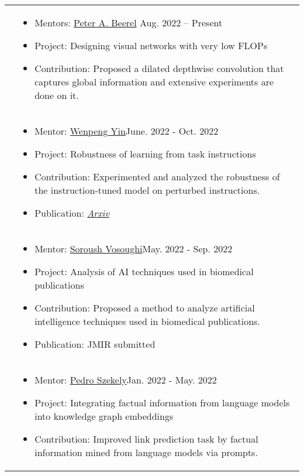 \documentclass[letterpaper, 10pt]{article}
\begin{document}
\begin{longtable}{p{1.3in}p{4.8in}}
&  \begin{itemize}[leftmargin=10pt, itemsep=-5pt, topsep=0pt,before=\textbf{University of Southern California}]
    \item Mentors: \href{https://sites.usc.edu/eessc/people/}{Peter A. Beerel} \hfill Aug. 2022 -- Present 
    \item Project: Designing visual networks with very low FLOPs
    \item Contribution: Proposed a dilated depthwise convolution that captures global information and extensive experiments are done on it.
  \end{itemize}\\ 
  

&  \begin{itemize}[leftmargin=10pt, itemsep=-5pt, topsep=0pt,before=\textbf{Pennsylvania State University}]
    \item Mentor: \href{https://www.wenpengyin.org/}{Wenpeng Yin}\hfill June. 2022 - Oct. 2022
    \item Project: Robustness of learning from task instructions\hfill
    \item Contribution: Experimented and analyzed the robustness of the instruction-tuned model on perturbed instructions.
    \item Publication: \href{https://arxiv.org/abs/2212.03813}{\textit{Arxiv}}
  \end{itemize}\\ 

&  \begin{itemize}[leftmargin=10pt, itemsep=-5pt, topsep=0pt,before=\textbf{Dartmouth College}]
    \item Mentor: \href{https://www.cs.dartmouth.edu/~soroush//}{Soroush Vosoughi}\hfill May. 2022 - Sep. 2022
    \item Project: Analysis of AI techniques used in biomedical publications\hfill
    \item Contribution: Proposed a method to analyze artificial intelligence techniques used in biomedical publications.
    \item Publication: JMIR submitted
  \end{itemize}\\ 
  
&  \begin{itemize}[leftmargin=10pt, itemsep=-5pt, topsep=0pt,before=\textbf{University of Southern California}]
    \item Mentor: \href{https://usc-isi-i2.github.io/szekely/}{Pedro Szekely}\hfill Jan. 2022 - May. 2022
    \item Project: Integrating factual information from language models into knowledge graph embeddings \hfill 
    \item Contribution: Improved link prediction task by factual information mined from language models via prompts.
  \end{itemize}\\ 


\end{longtable}
\end{document}
